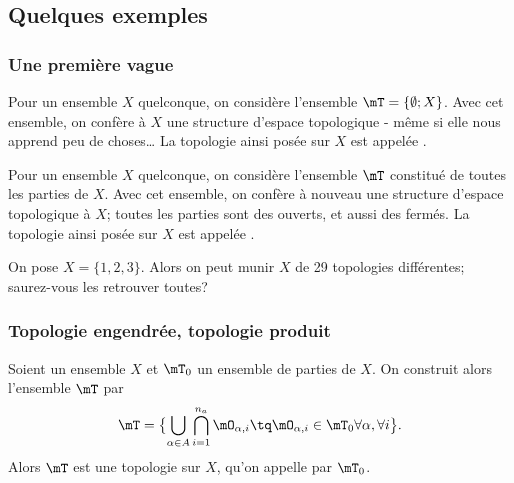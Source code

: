 \subsection{Quelques exemples}

\subsubsection{Une première vague}

\begin{example}\label{DefTopologieGrossiere}
  Pour un ensemble \( X \) quelconque, on considère l'ensemble \( \mT = \{ \emptyset; X\} \). Avec cet ensemble, on confère à \(X \) une structure d'espace topologique - même si elle nous apprend peu de choses\dots{} La topologie ainsi posée sur \(X \) est appelée .
\end{example}

\begin{example}\label{DefTopologieDiscrete}
  Pour un ensemble \( X \) quelconque, on considère l'ensemble \( \mT \) constitué de toutes les parties de \( X \). Avec cet ensemble, on confère à nouveau une structure d'espace topologique à \(X \); toutes les parties sont des ouverts, et aussi des fermés. La topologie ainsi posée sur \(X \) est appelée .
\end{example}

\begin{example} 
    On pose \( X = \{1, 2, 3\} \). Alors on peut munir \( X \) de 29 topologies différentes\cite{BIBooSLBZooRYtdIi}; saurez-vous les retrouver toutes?
\end{example}

\subsubsection{Topologie engendrée, topologie produit}

\begin{propositionDef}\label{DefTopologieEngendree}
  Soient un ensemble \( X \) et \( \mT_0 \) un ensemble de parties de \( X \). On construit alors l'ensemble \( \mT \) par
  \begin{equation}
    \label{EqTopologieEngendree}
    \mT = \bigl\{\bigcup_{\alpha \in A} \bigcap_{i=1}^{n_a} \mO_{\alpha, i} \tq \mO_{\alpha,i} \in \mT_0 \forall \alpha, \forall i \bigr\}.
  \end{equation}
  Alors \(\mT \) est une topologie sur \(X\), qu'on appelle  par \( \mT_0 \).
\end{propositionDef}
    

